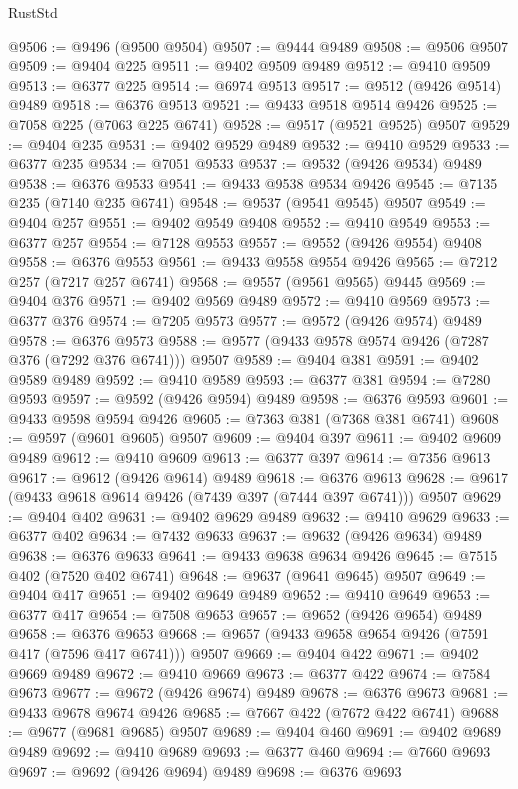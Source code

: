 \begin{lexlean}{RustStd}
\begin{coremodule}
@9506 := @9496 (@9500 @9504)
@9507 := @9444 @9489
@9508 := @9506 @9507
@9509 := @9404 @225
@9511 := @9402 @9509 @9489
@9512 := @9410 @9509
@9513 := @6377 @225
@9514 := @6974 @9513
@9517 := @9512 (@9426 @9514) @9489
@9518 := @6376 @9513
@9521 := @9433 @9518 @9514 @9426
@9525 := @7058 @225 (@7063 @225 @6741)
@9528 := @9517 (@9521 @9525) @9507
@9529 := @9404 @235
@9531 := @9402 @9529 @9489
@9532 := @9410 @9529
@9533 := @6377 @235
@9534 := @7051 @9533
@9537 := @9532 (@9426 @9534) @9489
@9538 := @6376 @9533
@9541 := @9433 @9538 @9534 @9426
@9545 := @7135 @235 (@7140 @235 @6741)
@9548 := @9537 (@9541 @9545) @9507
@9549 := @9404 @257
@9551 := @9402 @9549 @9408
@9552 := @9410 @9549
@9553 := @6377 @257
@9554 := @7128 @9553
@9557 := @9552 (@9426 @9554) @9408
@9558 := @6376 @9553
@9561 := @9433 @9558 @9554 @9426
@9565 := @7212 @257 (@7217 @257 @6741)
@9568 := @9557 (@9561 @9565) @9445
@9569 := @9404 @376
@9571 := @9402 @9569 @9489
@9572 := @9410 @9569
@9573 := @6377 @376
@9574 := @7205 @9573
@9577 := @9572 (@9426 @9574) @9489
@9578 := @6376 @9573
@9588 := @9577 (@9433 @9578 @9574 @9426 (@7287 @376 (@7292 @376 @6741))) @9507
@9589 := @9404 @381
@9591 := @9402 @9589 @9489
@9592 := @9410 @9589
@9593 := @6377 @381
@9594 := @7280 @9593
@9597 := @9592 (@9426 @9594) @9489
@9598 := @6376 @9593
@9601 := @9433 @9598 @9594 @9426
@9605 := @7363 @381 (@7368 @381 @6741)
@9608 := @9597 (@9601 @9605) @9507
@9609 := @9404 @397
@9611 := @9402 @9609 @9489
@9612 := @9410 @9609
@9613 := @6377 @397
@9614 := @7356 @9613
@9617 := @9612 (@9426 @9614) @9489
@9618 := @6376 @9613
@9628 := @9617 (@9433 @9618 @9614 @9426 (@7439 @397 (@7444 @397 @6741))) @9507
@9629 := @9404 @402
@9631 := @9402 @9629 @9489
@9632 := @9410 @9629
@9633 := @6377 @402
@9634 := @7432 @9633
@9637 := @9632 (@9426 @9634) @9489
@9638 := @6376 @9633
@9641 := @9433 @9638 @9634 @9426
@9645 := @7515 @402 (@7520 @402 @6741)
@9648 := @9637 (@9641 @9645) @9507
@9649 := @9404 @417
@9651 := @9402 @9649 @9489
@9652 := @9410 @9649
@9653 := @6377 @417
@9654 := @7508 @9653
@9657 := @9652 (@9426 @9654) @9489
@9658 := @6376 @9653
@9668 := @9657 (@9433 @9658 @9654 @9426 (@7591 @417 (@7596 @417 @6741))) @9507
@9669 := @9404 @422
@9671 := @9402 @9669 @9489
@9672 := @9410 @9669
@9673 := @6377 @422
@9674 := @7584 @9673
@9677 := @9672 (@9426 @9674) @9489
@9678 := @6376 @9673
@9681 := @9433 @9678 @9674 @9426
@9685 := @7667 @422 (@7672 @422 @6741)
@9688 := @9677 (@9681 @9685) @9507
@9689 := @9404 @460
@9691 := @9402 @9689 @9489
@9692 := @9410 @9689
@9693 := @6377 @460
@9694 := @7660 @9693
@9697 := @9692 (@9426 @9694) @9489
@9698 := @6376 @9693

\end{coremodule}
\end{lexlean}
